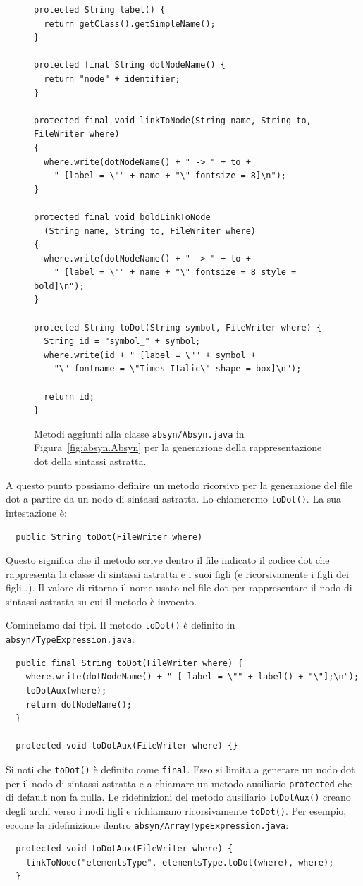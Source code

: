 \begin{figure}[t]
{\small\begin{verbatim}
protected String label() {
  return getClass().getSimpleName();
}

protected final String dotNodeName() {
  return "node" + identifier;
}

protected final void linkToNode(String name, String to, FileWriter where)
{
  where.write(dotNodeName() + " -> " + to +
    " [label = \"" + name + "\" fontsize = 8]\n");
}

protected final void boldLinkToNode
  (String name, String to, FileWriter where)
{
  where.write(dotNodeName() + " -> " + to +
    " [label = \"" + name + "\" fontsize = 8 style = bold]\n");
}

protected String toDot(String symbol, FileWriter where) {
  String id = "symbol_" + symbol;
  where.write(id + " [label = \"" + symbol +
    "\" fontname = \"Times-Italic\" shape = box]\n");

  return id;
}
\end{verbatim}}
\caption{Metodi aggiunti alla classe \texttt{absyn/Absyn.java} in Figura~\ref{fig:absyn.Absyn} per la generazione della rappresentazione dot della sintassi astratta.}
  \label{fig:absyn.Absyn_dot}
\end{figure}

A questo punto possiamo definire un metodo ricorsivo per la generazione del
file dot a partire da un nodo di sintassi astratta. Lo chiameremo
\texttt{toDot()}. La sua intestazione \`e:
%
\begin{verbatim}
  public String toDot(FileWriter where)
\end{verbatim}
%
Questo significa che il metodo scrive dentro il file indicato il codice
dot che rappresenta la classe di sintassi astratta e i suoi figli (e
ricorsivamente i figli dei figli\ldots). Il valore
di ritorno \e il nome usato nel file dot per rappresentare il nodo
di sintassi astratta su cui il metodo \`e invocato.

Cominciamo dai tipi. Il metodo \texttt{toDot()} \`e \cosi definito in
\texttt{absyn/TypeExpression.java}:
%
\begin{verbatim}
  public final String toDot(FileWriter where) {
    where.write(dotNodeName() + " [ label = \"" + label() + "\"];\n");
    toDotAux(where);
    return dotNodeName();
  }

  protected void toDotAux(FileWriter where) {}
\end{verbatim}
%
Si noti che \texttt{toDot()}
\`e definito come \texttt{final}. Esso si limita a generare
un nodo dot per il nodo di sintassi astratta e a chiamare un metodo ausiliario
\texttt{protected} che di default non fa nulla. Le ridefinizioni del
metodo ausiliario \texttt{toDotAux()} creano degli archi
verso i nodi figli e richiamano ricorsivamente \texttt{toDot()}.
Per esempio, eccone la ridefinizione dentro
\texttt{absyn/ArrayTypeExpression.java}:
%
\begin{verbatim}
  protected void toDotAux(FileWriter where) {
    linkToNode("elementsType", elementsType.toDot(where), where);
  }
\end{verbatim}

